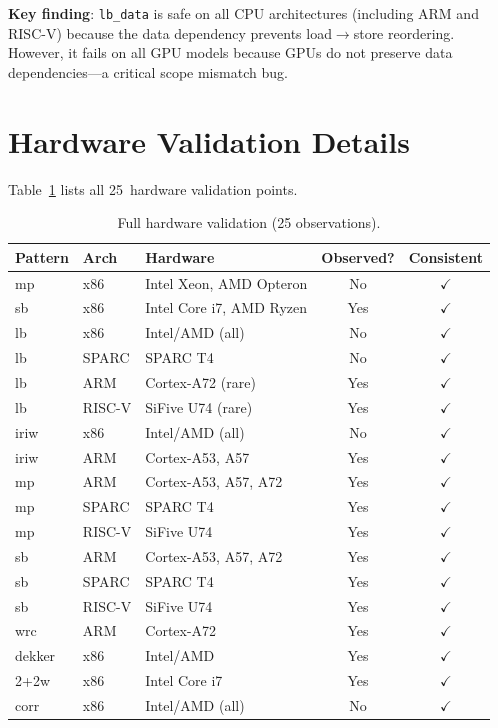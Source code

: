 \documentclass[10pt]{article}
\newcommand{\cmark}{$\checkmark$}
\begin{document}
\textbf{Key finding}: \texttt{lb\_data} is safe on all CPU
architectures (including ARM and RISC-V) because the data dependency
prevents load$\to$store reordering. However, it fails on all GPU
models because GPUs do not preserve data dependencies---a critical
scope mismatch bug.

\section{Hardware Validation Details}
\label{app:hw-validation}

Table~\ref{tab:hw-full} lists all 25~hardware validation points.

\begin{table}[h]
\centering
\caption{Full hardware validation (25 observations).}
\label{tab:hw-full}
\small
\begin{tabular}{lllcc}
\toprule
\textbf{Pattern} & \textbf{Arch} & \textbf{Hardware} & \textbf{Observed?} & \textbf{Consistent} \\
\midrule
mp & x86 & Intel Xeon, AMD Opteron & No & \cmark \\
sb & x86 & Intel Core i7, AMD Ryzen & Yes & \cmark \\
lb & x86 & Intel/AMD (all) & No & \cmark \\
lb & SPARC & SPARC T4 & No & \cmark \\
lb & ARM & Cortex-A72 (rare) & Yes & \cmark \\
lb & RISC-V & SiFive U74 (rare) & Yes & \cmark \\
iriw & x86 & Intel/AMD (all) & No & \cmark \\
iriw & ARM & Cortex-A53, A57 & Yes & \cmark \\
mp & ARM & Cortex-A53, A57, A72 & Yes & \cmark \\
mp & SPARC & SPARC T4 & Yes & \cmark \\
mp & RISC-V & SiFive U74 & Yes & \cmark \\
sb & ARM & Cortex-A53, A57, A72 & Yes & \cmark \\
sb & SPARC & SPARC T4 & Yes & \cmark \\
sb & RISC-V & SiFive U74 & Yes & \cmark \\
wrc & ARM & Cortex-A72 & Yes & \cmark \\
dekker & x86 & Intel/AMD & Yes & \cmark \\
2+2w & x86 & Intel Core i7 & Yes & \cmark \\
corr & x86 & Intel/AMD (all) & No & \cmark \\

\end{tabular}
\end{table}
\end{document}
